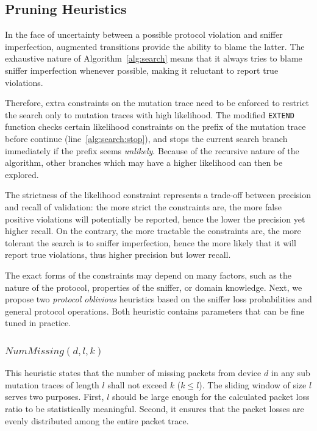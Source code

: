 \subsection{Pruning Heuristics}
\label{subsec:heuristic}

In the face of uncertainty between a possible
protocol violation and sniffer imperfection, augmented transitions provide the
ability to blame the latter. The exhaustive nature of
Algorithm~\ref{alg:search} means that it always tries to blame sniffer
imperfection whenever possible, making it reluctant to report true
violations.

Therefore, extra constraints on the mutation trace need to be enforced to
restrict the search only to mutation traces with high likelihood.
The modified
\texttt{EXTEND} function checks certain likelihood constraints on the prefix of
the mutation trace before continue (line~\ref{alg:search:stop}), and stops the
current search branch immediately if the prefix seems \textit{unlikely}.
Because of the recursive nature of the algorithm, other branches which may have
a higher likelihood can then be explored.

The strictness of the likelihood constraint represents a trade-off between
precision and recall of validation: the more strict the constraints are, the
more false positive violations will potentially be reported, hence the lower the
precision yet higher recall.  On the contrary, the more tractable the
constraints are, the more tolerant the search is to sniffer imperfection, hence
the more likely that it will report true violations, thus higher precision but
lower recall.

The exact forms of the constraints may depend on many factors, such as the
nature of the protocol, properties of the sniffer, or domain knowledge.  Next,
we propose two \textit{protocol oblivious} heuristics based on the sniffer loss
probabilities and general protocol operations. Both heuristic contains
parameters that can be fine tuned in practice.

\vspace*{-3mm}
\subsubsection{$\mathit{NumMissing}(d, l, k)$}

This heuristic states that the number of missing packets from device $d$ in any
sub mutation traces of length $l$ shall not exceed $k$ ($k \le l$).  The sliding
window of size $l$ serves two purposes. First, $l$ should be large enough for
the calculated packet loss ratio to be statistically meaningful.  Second, it
ensures that the packet losses are evenly distributed among the entire packet
trace.

